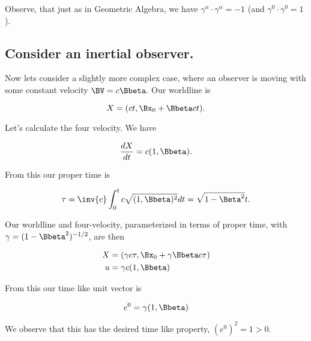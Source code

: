 Observe, that just as in Geometric Algebra, we have $\gamma^\alpha \cdot \gamma^\alpha = -1$ (and $\gamma^0 \cdot \gamma^0 = 1$).

\subsection{Consider an inertial observer.}

Now lets consider a slightly more complex case, where an observer is moving with some constant velocity $\BV = c \Bbeta$.  Our worldline is

\begin{equation}\label{eqn:relativisticElectrodynamicsT2:700}
X = ( ct, \Bx_0 + \Bbeta c t) .
\end{equation}

Let's calculate the four velocity.  We have

\begin{equation}\label{eqn:relativisticElectrodynamicsT2:710}
\frac{dX}{dt} = c ( 1, \Bbeta ).
\end{equation}

From this our proper time is

\begin{equation}\label{eqn:relativisticElectrodynamicsT2:720}
\tau = \inv{c} \int_0^t c \sqrt{ (1, \Bbeta)^2 } dt = \sqrt{1 - \Beta^2} t.
\end{equation}

Our worldline and four-velocity, parameterized in terms of proper time, with $\gamma = (1 - \Bbeta^2)^{-1/2}$, are then

\begin{align}\label{eqn:relativisticElectrodynamicsT2:730}
X &= ( \gamma c\tau, \Bx_0 + \gamma \Bbeta c \tau) \\
u &= \gamma c ( 1, \Bbeta )
\end{align}

From this our time like unit vector is

\begin{equation}\label{eqn:relativisticElectrodynamicsT2:740}
e^0 = \gamma ( 1, \Bbeta )
\end{equation}

We observe that this has the desired time like property, $(e^0)^2 = 1 > 0$.

